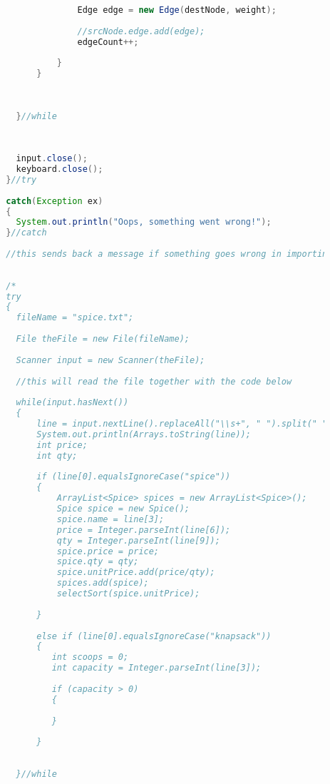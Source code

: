 \documentclass[letterpaper, 10pt]{article}
\begin{document}
\begin{lstlisting}[language = java]
	    			  
	    			  Edge edge = new Edge(destNode, weight);
	    			  
	    			  //srcNode.edge.add(edge);
	    			  edgeCount++;
	    			  
	    		  }
	    	  } 
	    	  
	    	  
	    	  
	      }//while
	     
	      
	   
	      input.close();
	      keyboard.close();
	    }//try
	    
	    catch(Exception ex)
	    {
	      System.out.println("Oops, something went wrong!");
	    }//catch
	    
	    //this sends back a message if something goes wrong in importing the text into the array from magic items
	    
	  
	    /*
	    try
	    { 
	      fileName = "spice.txt";
	     
	      File theFile = new File(fileName);   
	      
	      Scanner input = new Scanner(theFile);
	      
	      //this will read the file together with the code below         
	      
	      while(input.hasNext())
	      {
	    	  line = input.nextLine().replaceAll("\\s+", " ").split(" ");
	    	  System.out.println(Arrays.toString(line));
	    	  int price;
	    	  int qty;
	    	  
	    	  if (line[0].equalsIgnoreCase("spice"))
	    	  {
	    		  ArrayList<Spice> spices = new ArrayList<Spice>();
	    		  Spice spice = new Spice();
	    		  spice.name = line[3];
	    		  price = Integer.parseInt(line[6]);
	    		  qty = Integer.parseInt(line[9]);
	    		  spice.price = price;
	    		  spice.qty = qty;
	    		  spice.unitPrice.add(price/qty);
	    		  spices.add(spice);
	    		  selectSort(spice.unitPrice);
	    		  
	    	  }
	    	  
	    	  else if (line[0].equalsIgnoreCase("knapsack"))
	    	  {
	    		 int scoops = 0;
	    		 int capacity = Integer.parseInt(line[3]);
	    		 
	    		 if (capacity > 0)
	    		 {
	    			 
	    		 }
	    		  
	    	  }
	    	  
	    	  
	      }//while
	     
	      
	   

\end{lstlisting}
\end{document}

